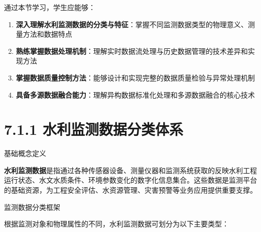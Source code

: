 通过本节学习，学生应能够：

\begin{enumerate}
\def\labelenumi{\arabic{enumi}.}
\tightlist
\item
  \textbf{深入理解水利监测数据的分类与特征}：掌握不同监测数据类型的物理意义、测量方法和数据特点
\item
  \textbf{熟练掌握数据处理机制}：理解实时数据流处理与历史数据管理的技术差异和实现方法
\item
  \textbf{掌握数据质量控制方法}：能够设计和实现完整的数据质量检验与异常处理机制
\item
  \textbf{具备多源数据融合能力}：理解异构数据标准化处理和多源数据融合的核心技术
\end{enumerate}

\section{7.1.1 水利监测数据分类体系}

 基础概念定义

\textbf{水利监测数据}是指通过各种传感器设备、测量仪器和监测系统获取的反映水利工程运行状态、水文水质条件、环境参数变化的数字化信息集合。这些数据是监测平台的基础资源，为工程安全评估、水资源管理、灾害预警等业务应用提供重要支撑。

 监测数据分类框架

根据监测对象和物理属性的不同，水利监测数据可划分为以下主要类型：

